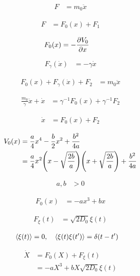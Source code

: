 \documentclass[a4paper,10pt]{article}
\begin{document}
\begin{align}
	F
	&=
	m_0\ddot{x}
\end{align}

\begin{align}
	F
	&=
	F_0(x)
	+
	F_1
\end{align}

\begin{align}
	F_0(x)
	&=
	-\pdv{V_0}{x}
\end{align}

\begin{align}
	F_\gamma
	(\dot{x})
	&=
	-\gamma
	\dot{x}
\end{align}

\begin{align}
	F_0(x)
	+
	F_\gamma
	(\dot{x})
	+
	F_2
	&=
	m_0
	\ddot{x}
\end{align}

\begin{align}
	\frac{m_0}{\gamma}
	\ddot{x}
	+
	\dot{x}
	&=
	\gamma^{-1}
	F_0(x)
	+
	\gamma^{-1}
	F_2
\end{align}


\begin{align}
	\dot{x}
	&=
	F_0(x)
	+
	F_2
\end{align}


\begin{align}
	V_0
	(x)
	&=
	\frac{a}{4}
	x^4
	-
	\frac{b}{2}
	x^2
	+
	\frac{b^2}{4a}
\\
	&=
	\frac{a}{4}
	x^2
	\pqty{
		x-\sqrt{\frac{2b}{a}}
	}
	\pqty{
		x+\sqrt{\frac{2b}{a}}	
	}
	+
	\frac{b^2}{4a}
\end{align}

\begin{align}
	a,b&>0
\end{align}

\begin{align}
	F_0(x)
	&=
	-ax^3
	+bx
\end{align}

\begin{align}
	F_\xi(t)
	&=
	\sqrt{2D_0}
	\xi(t)
\end{align}

\begin{align}
	\expval{\xi(t)}
	&=
	0,
	\quad
	\expval{\xi(t)\xi(t^\prime)}
	=
	\delta(t-t^\prime)
\end{align}

\begin{align}
	\dot{X}
	&=
	F_0(X)
	+
	F_\xi(t)
\\
	&=
	-aX^3+bX
	\sqrt{2D_0}
	\xi(t)
\end{align}
\end{document}
